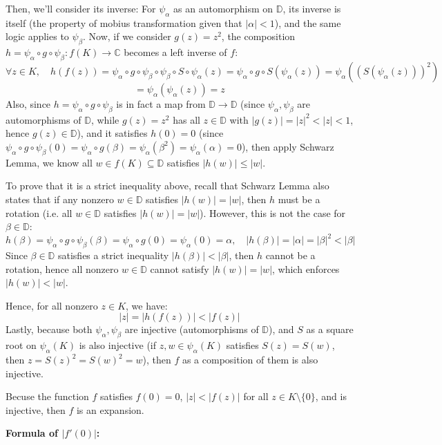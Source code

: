 \documentclass{article}
\begin{document}
\begin{itemize}
    Then, we'll consider its inverse: 
    For $\psi_\alpha$ as an automorphism on $\mathbb{D}$, its inverse is itself (the property of mobius transformation given that $|\alpha|<1$), and the same logic applies to $\psi_\beta$.
    Now, if we consider $g(z)=z^2$, the composition $h=\psi_\alpha\circ g\circ\psi_\beta:f(K)\rightarrow \mathbb{C}$ becomes a left inverse of $f$:
    $$\forall z\in K,\quad h(f(z))=\psi_\alpha\circ g\circ\psi_\beta\circ\psi_\beta\circ S\circ \psi_\alpha(z) = \psi_\alpha\circ g\circ S(\psi_\alpha(z)) = \psi_\alpha((S(\psi_\alpha(z)))^2)$$
    $$ = \psi_\alpha(\psi_\alpha(z))=z$$
    Also, since $h=\psi_\alpha\circ g\circ \psi_\beta$ is in fact a map from $\mathbb{D}\rightarrow\mathbb{D}$ (since $\psi_\alpha,\psi_\beta$ are automorphisms of $\mathbb{D}$, while $g(z)=z^2$ has all $z\in\mathbb{D}$ with $|g(z)|=|z|^2<|z|<1$, hence $g(z)\in\mathbb{D}$),
    and it satisfies $h(0)=0$ (since $\psi_\alpha\circ g\circ \psi_\beta(0)=\psi_\alpha\circ g(\beta)=\psi_\alpha(\beta^2)=\psi_\alpha(\alpha)=0$),
    then apply Schwarz Lemma, we know all $w\in f(K)\subseteq\mathbb{D}$ satisfies $|h(w)|\leq |w|$. 

    To prove that it is a strict inequality above, recall that Schwarz Lemma also states that if any nonzero $w\in\mathbb{D}$ satisfies $|h(w)|=|w|$, then $h$ must be a rotation (i.e. all $w\in\mathbb{D}$ satisfies $|h(w)|=|w|$). However, this is not the case for $\beta\in\mathbb{D}$:
    $$h(\beta)=\psi_\alpha\circ g\circ\psi_{\beta}(\beta) = \psi_\alpha\circ g(0)=\psi_\alpha(0)=\alpha,\quad |h(\beta)|=|\alpha|=|\beta|^2 < |\beta|$$
    Since $\beta\in\mathbb{D}$ satisfies a strict inequality $|h(\beta)|<|\beta|$, then $h$ cannot be a rotation, hence all nonzero $w\in\mathbb{D}$ cannot satisfy $|h(w)|=|w|$, which enforces $|h(w)|<|w|$.

    Hence, for all nonzero $z\in K$, we have:
    $$|z|=|h(f(z))|< |f(z)|$$
    Lastly, because both $\psi_\alpha,\psi_\beta$ are injective (automorphisms of $\mathbb{D}$), and $S$ as a square root on $\psi_\alpha(K)$ is also injective (if $z,w\in\psi_\alpha(K)$ satisfies $S(z)=S(w)$, then $z=S(z)^2=S(w)^2=w$), then $f$ as a composition of them is also injective.

    Becuse the function $f$ satisfies $f(0)=0$, $|z|< |f(z)|$ for all $z\in K\setminus\{0\}$, and is injective, then $f$ is an expansion.

    \textbf{Formula of $|f'(0)|$:}


\end{itemize}
\end{document}

